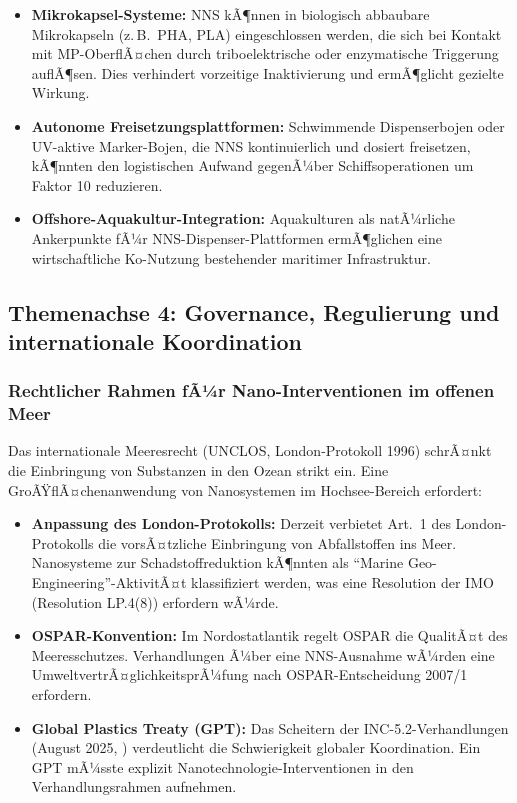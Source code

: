 ﻿\documentclass[12pt,a4paper]{article}
\theoremstyle{definition}
\theoremstyle{remark}
\begin{document}
\begin{itemize}
  \item \textbf{Mikrokapsel-Systeme:} NNS kÃ¶nnen in biologisch abbaubare
        Mikrokapseln (z.\,B.\ PHA, PLA) eingeschlossen werden, die sich bei
        Kontakt mit MP-OberflÃ¤chen durch triboelektrische oder enzymatische
        Triggerung auflÃ¶sen. Dies verhindert vorzeitige Inaktivierung
        und ermÃ¶glicht gezielte Wirkung.
  \item \textbf{Autonome Freisetzungsplattformen:} Schwimmende Dispenserbojen
        oder UV-aktive Marker-Bojen, die NNS kontinuierlich und dosiert
        freisetzen, kÃ¶nnten den logistischen Aufwand gegenÃ¼ber Schiffsoperationen
        um Faktor 10 reduzieren.
  \item \textbf{Offshore-Aquakultur-Integration:} Aquakulturen als
        natÃ¼rliche Ankerpunkte fÃ¼r NNS-Dispenser-Plattformen ermÃ¶glichen
        eine wirtschaftliche Ko-Nutzung bestehender maritimer Infrastruktur.
\end{itemize}

\subsection{Themenachse 4: Governance, Regulierung und internationale Koordination}

\subsubsection{Rechtlicher Rahmen fÃ¼r Nano-Interventionen im offenen Meer}

Das internationale Meeresrecht (UNCLOS, London-Protokoll 1996) schrÃ¤nkt die
Einbringung von Substanzen in den Ozean strikt ein. Eine GroÃŸflÃ¤chenanwendung
von Nanosystemen im Hochsee-Bereich erfordert:

\begin{itemize}
  \item \textbf{Anpassung des London-Protokolls:} Derzeit verbietet Art.\ 1
        des London-Protokolls die vorsÃ¤tzliche Einbringung von
        Abfallstoffen ins Meer. Nanosysteme zur Schadstoffreduktion
        kÃ¶nnten als ``Marine Geo-Engineering''-AktivitÃ¤t klassifiziert werden,
        was eine Resolution der IMO (Resolution LP.4(8)) erfordern wÃ¼rde.
  \item \textbf{OSPAR-Konvention:} Im Nordostatlantik regelt OSPAR die
        QualitÃ¤t des Meeresschutzes. Verhandlungen Ã¼ber eine
        NNS-Ausnahme wÃ¼rden eine UmweltvertrÃ¤glichkeitsprÃ¼fung nach
        OSPAR-Entscheidung 2007/1 erfordern.
  \item \textbf{Global Plastics Treaty (GPT):} Das Scheitern der
        INC-5.2-Verhandlungen (August 2025, \cite{farrelly2025stalemates})
        verdeutlicht die Schwierigkeit globaler Koordination. Ein GPT
        mÃ¼sste explizit Nanotechnologie-Interventionen in den Verhandlungsrahmen
        aufnehmen.
\end{itemize}
\end{document}
